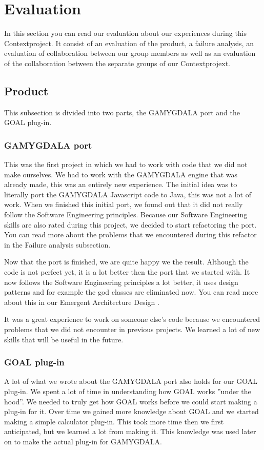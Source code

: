 \section{Evaluation}
In this section you can read our evaluation about our experiences during this Contextproject. It consist of an evaluation of the product, a failure analysis, an evaluation of collaboration between our group members as well as an evaluation of the collaboration between the separate groups of our Contextprojext.

\subsection{Product}
This subsection is divided into two parts, the GAMYGDALA port and the GOAL plug-in.

\subsubsection{GAMYGDALA port}
This was the first project in which we had to work with code that we did not make ourselves. We had to work with the GAMYGDALA engine that was already made, this was an entirely new experience. The initial idea was to literally port the GAMYGDALA Javascript code to Java, this was not a lot of work. When we finished this initial port, we found out that it did not really follow the Software Engineering principles. Because our Software Engineering skills are also rated during this project, we decided to start refactoring the port. You can read more about the problems that we encountered during this refactor in the Failure analysis subsection. \par
Now that the port is finished, we are quite happy we the result. Although the code is not perfect yet, it is a lot better then the port that we started with. It now follows the Software Engineering principles a lot better, it uses design patterns and for example the god classes are eliminated now. You can read more about this in our Emergent Architecture Design \citep{ead}. \par
It was a great experience to work on someone else's code because we encountered problems that we did not encounter in previous projects. We learned a  lot of new skills that will be useful in the future.

\subsubsection{GOAL plug-in}
A lot of what we wrote about the GAMYGDALA port also holds for our GOAL plug-in. We spent a lot of time in understanding how GOAL works ''under the hood''. We needed to truly get how GOAL works before we could start making a plug-in for it. Over time we gained more knowledge about GOAL and we started making a simple calculator plug-in. This took more time then we first anticipated, but we learned a lot from making it. This knowledge was used later on to make the actual plug-in for GAMYGDALA.

